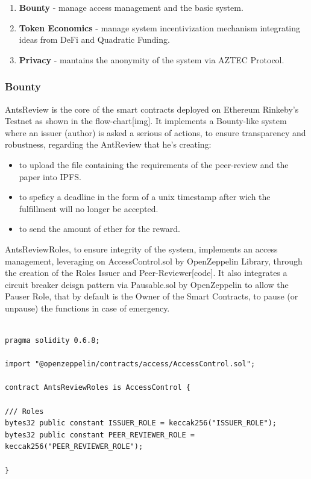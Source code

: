 \documentclass[runningheads]{llncs}
\begin{document}
\begin{enumerate}
  \item \textbf{Bounty} - manage access management and the basic system.
  \item \textbf{Token Economics} - manage system incentivization mechanism integrating ideas from DeFi and Quadratic Funding.
  \item \textbf{Privacy} - mantains the anonymity of the system via AZTEC Protocol.
\end{enumerate}

\subsubsection{Bounty}
AntsReview is the core of the smart contracts deployed on Ethereum Rinkeby's Testnet as shown in the flow-chart[img].
\newline It implements a Bounty-like system where an issuer (author) is asked a serious of actions, to ensure transparency and robustness, regarding the AntReview that he's creating:
\begin{itemize}
  \item to upload the file containing the requirements of the peer-review and the paper into IPFS.
  \item to speficy a deadline in the form of a unix timestamp after wich the fulfillment will no longer be accepted.
  \item to send the amount of ether for the reward.
\end{itemize}

AntsReviewRoles, to ensure integrity of the system, implements an access management, leveraging on AccessControl.sol by OpenZeppelin Library, through the creation of the Roles Issuer and Peer-Reviewer[code].
\newline It also integrates a circuit breaker deisgn pattern via Pausable.sol by OpenZeppelin to allow the Pauser Role, that by default is the Owner of the Smart Contracts, to pause (or unpause) the functions in case of emergency.

\begin{lstlisting}[language=Solidity]

pragma solidity 0.6.8;

import "@openzeppelin/contracts/access/AccessControl.sol";

contract AntsReviewRoles is AccessControl {

/// Roles
bytes32 public constant ISSUER_ROLE = keccak256("ISSUER_ROLE");
bytes32 public constant PEER_REVIEWER_ROLE = keccak256("PEER_REVIEWER_ROLE");

}
\end{lstlisting}
\end{document}
